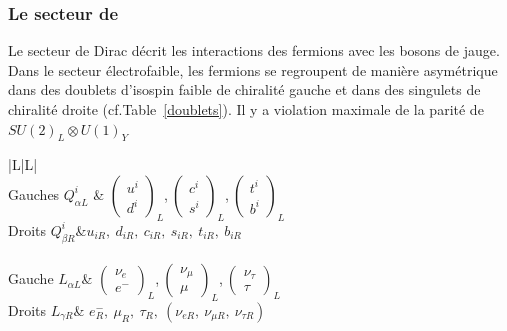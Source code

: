 \subsubsection{Le secteur de }
Le secteur de Dirac décrit les interactions des fermions avec les bosons de jauge. Dans le secteur électrofaible, les fermions se regroupent de manière asymétrique dans des doublets d'isospin faible de chiralité gauche et dans des singulets de chiralité droite (cf.Table~\ref{doublets}). Il y a violation maximale de la parité de $SU(2)_{L}\otimes U(1)_{Y}$

\begin{table}[H]
	\centering
	\begin{tabular}{|L|L|} 
	\hline
	 \\
	\hline
	Gauches $Q_{\alpha L}^{i}$ & $
	\left(\begin{matrix} 
	 u^{i}\\
	 d^{i} 
	\end{matrix}\right)_{L}$,$\ 
	\left(\begin{matrix} 
	 c^{i}\\
	 s^{i}
	\end{matrix}\right)_{L}$,$\ 
	\left(\begin{matrix} 
	 t^{i}\\
	 b^{i}
	\end{matrix}\right)_{L}$ \\
	\hline
	Droits $Q_{\beta R}^{i}$&$ u_{iR},\ d_{iR},\ c_{iR},\ s_{iR},\ t_{iR},\ b_{iR}$\\
	\hline
	\rowcolor{Green2}\multicolumn{2}{|Cc|}{Leptons} \\
	\hline
	Gauche $L_{\alpha L}$& $
	\left(\begin{matrix} 
	\nu_{e}\\
	 e^{-}
	\end{matrix}\right)_{L}$,$\ 
	\left(\begin{matrix} 
	\nu_{\mu}\\
	\mu
	\end{matrix}\right)_{L}$,$\ 
	\left(\begin{matrix} 
	\nu_{\tau}\\
	\tau
	\end{matrix}\right)_{L} $\\
	\hline
	Droits $L_{\gamma R}$& $e^{-}_{R},\ \mu_{R},\ \tau_{R},\ \left(\nu_{e R},\ \nu_{\mu R},\ \nu_{\tau R}\right)$ \\
	\hline
\end{tabular}
\label{doublets}
\end{table}	


